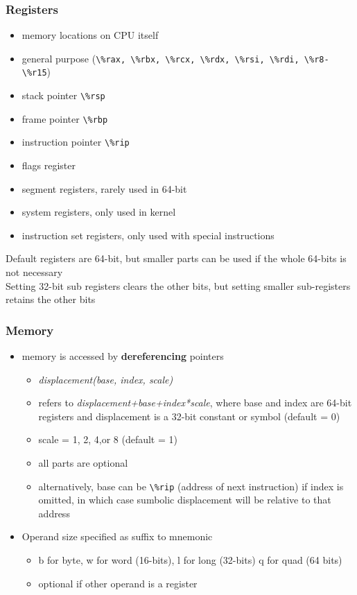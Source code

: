 \documentclass{article}
\begin{document}
\subsubsection{Registers}
\begin{itemize}
    \item memory locations on CPU itself
    \item general purpose (\verb|\%rax, \%rbx, \%rcx, \%rdx, \%rsi, \%rdi, \%r8-\%r15|)
    \item stack pointer \verb|\%rsp|
    \item frame pointer \verb|\%rbp|
    \item instruction pointer \verb|\%rip|
    \item flags register
    \item segment registers, rarely used in 64-bit
    \item system registers, only used in kernel
    \item instruction set registers, only used with special instructions
\end{itemize}
Default registers are 64-bit, but smaller parts can be used if the whole 64-bits is not necessary
\\Setting 32-bit sub registers clears the other bits, but setting smaller sub-registers retains the other bits
\subsubsection{Memory}
\begin{itemize}
    \item memory is accessed by \textbf{dereferencing} pointers
    \begin{itemize}
        \item \textit{displacement(base, index, scale)}
        \item refers to \textit{displacement+base+index*scale}, where base and index are 64-bit registers and displacement is a 32-bit constant or symbol (default = 0)
        \item scale = 1, 2, 4,or 8 (default = 1)
        \item all parts are optional
        \item alternatively, base can be \verb|\%rip| (address of next instruction) if index is omitted, in which case sumbolic displacement will be relative to that address
    \end{itemize}
    \item Operand size specified as suffix to mnemonic
    \begin{itemize}
        \item b for byte, w for word (16-bits), l for long (32-bits) q for quad (64 bits)
        \item optional if other operand is a register
    \end{itemize}
\end{itemize}
\end{document}
